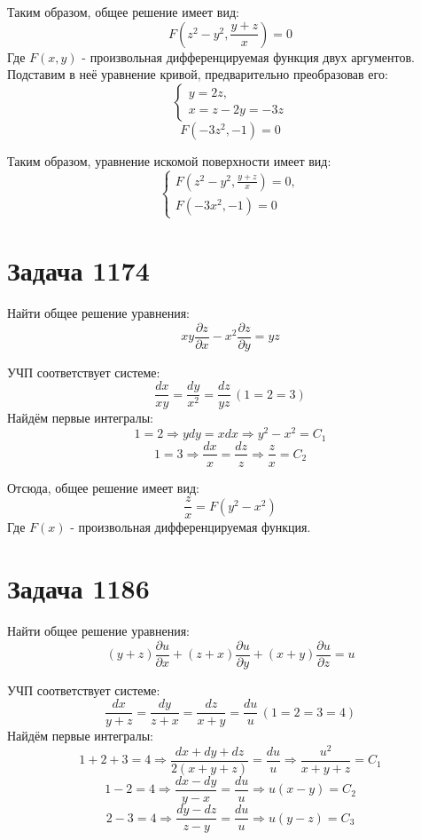 \documentclass[11pt]{article}
\begin{document}
Таким образом, общее решение имеет вид:
$$F\left(z^2 - y^2, \frac{y + z}{x}\right) = 0$$
Где \(F(x, y)\) - произвольная дифференцируемая функция двух аргументов. Подставим в неё уравнение кривой,
предварительно преобразовав его:
\begin{equation*}
  \begin{cases}
    y = 2z,\\
    x = z - 2y = -3z
  \end{cases}
\end{equation*}
$$F(-3z^2, -1) = 0$$

Таким образом, уравнение искомой поверхности имеет вид:
\begin{equation*}
  \begin{cases}
    F\left(z^2 - y^2, \frac{y + z}{x}\right) = 0,\\
    F(-3x^2, -1) = 0
  \end{cases}
\end{equation*}

\section{Задача 1174}
\label{sec:org4548e30}
Найти общее решение уравнения:
$$xy\frac{\partial{z}}{\partial{x}} - x^2\frac{\partial{z}}{\partial{y}} = yz$$

УЧП соответствует системе:
$$\frac{dx}{xy} = \frac{dy}{x^2} = \frac{dz}{yz} \, (1 = 2 = 3)$$
Найдём первые интегралы:
$$1 = 2 \Rightarrow ydy = xdx \Rightarrow y^2 - x^2 = C_1$$
$$1 = 3 \Rightarrow \frac{dx}{x} = \frac{dz}{z} \Rightarrow \frac{z}{x} = C_2$$

Отсюда, общее решение имеет вид:
$$\frac{z}{x} = F(y^2 - x^2)$$
Где \(F(x)\) - произвольная дифференцируемая функция.

\section{Задача 1186}
\label{sec:orgf5baddc}
Найти общее решение уравнения:
$$(y + z)\frac{\partial{u}}{\partial{x}} + (z + x)\frac{\partial{u}}{\partial{y}} + (x + y)\frac{\partial{u}}{\partial{z}} = u$$

УЧП соответствует системе:
$$\frac{dx}{y + z} = \frac{dy}{z + x} = \frac{dz}{x + y} = \frac{du}{u} \, (1 = 2 = 3 = 4)$$
Найдём первые интегралы:
$$1 + 2 + 3 = 4 \Rightarrow \frac{dx + dy + dz}{2(x + y + z)} = \frac{du}{u} \Rightarrow \frac{u^2}{x + y + z} = C_1$$
$$1 - 2 = 4 \Rightarrow \frac{dx - dy}{y - x} = \frac{du}{u} \Rightarrow u(x - y) = C_2$$
$$2 - 3 = 4 \Rightarrow \frac{dy - dz}{z - y} = \frac{du}{u} \Rightarrow u(y - z) = C_3$$
\end{document}
